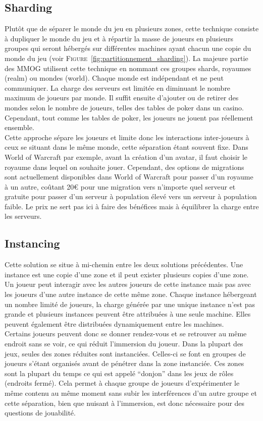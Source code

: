 \subsection{Sharding}
Plutôt que de séparer le monde du jeu en plusieurs zones, cette technique consiste à dupliquer le monde du jeu et à répartir la masse de joueurs en plusieurs groupes qui seront hébergés sur différentes machines ayant chacun une copie du monde du jeu (voir \textsc{Figure}~\ref{fig:partitionnement_sharding}). La majeure partie des MMOG utilisent cette technique en nommant ces groupes shards, royaumes (realm) ou mondes (world). Chaque monde est indépendant et ne peut communiquer. La charge des serveurs est limitée en diminuant le nombre maximum de joueurs par monde. Il suffit ensuite d'ajouter ou de retirer des mondes selon le nombre de joueurs, telles des tables de poker dans un casino. Cependant, tout comme les tables de poker, les joueurs ne jouent pas réellement ensemble.\\

Cette approche sépare les joueurs et limite donc les interactions inter-joueurs à ceux se situant dans le même monde, cette séparation étant souvent fixe. Dans World of Warcraft par exemple, avant la création d'un avatar, il faut choisir le royaume dans lequel on souhaite jouer. Cependant, des options de migrations sont actuellement disponibles dans World of Warcraft pour passer d'un royaume à un autre, coûtant 20\euro{} pour une migration vers n'importe quel serveur et gratuite pour passer d'un serveur à population élevé vers un serveur à population faible. Le prix ne sert pas ici à faire des bénéfices mais à équilibrer la charge entre les serveurs.

\subsection{Instancing}
Cette solution se situe à mi-chemin entre les deux solutions précédentes. Une instance est une copie d'une zone et il peut exister plusieurs copies d'une zone. Un joueur peut interagir avec les autres joueurs de cette instance mais pas avec les joueurs d'une autre instance de cette même zone. Chaque instance hébergeant un nombre limité de joueurs, la charge générée par une unique instance n'est pas grande et plusieurs instances peuvent être attribuées à une seule machine. Elles peuvent également être distribuées dynamiquement entre les machines.\\

Certains joueurs peuvent donc se donner rendez-vous et se retrouver au même endroit sans se voir, ce qui réduit l'immersion du joueur. Dans la plupart des jeux, seules des zones réduites sont instanciées. Celles-ci se font en groupes de joueurs s'étant organisés avant de pénétrer dans la zone instanciée. Ces zones sont la plupart du temps ce qui est appelé ``donjon'' dans les jeux de rôles (endroits fermé). Cela permet à chaque groupe de joueurs d'expérimenter le même contenu au même moment sans subir les interférences d'un autre groupe et cette séparation, bien que nuisant à l'immersion, est donc nécessaire pour des questions de jouabilité.\\

